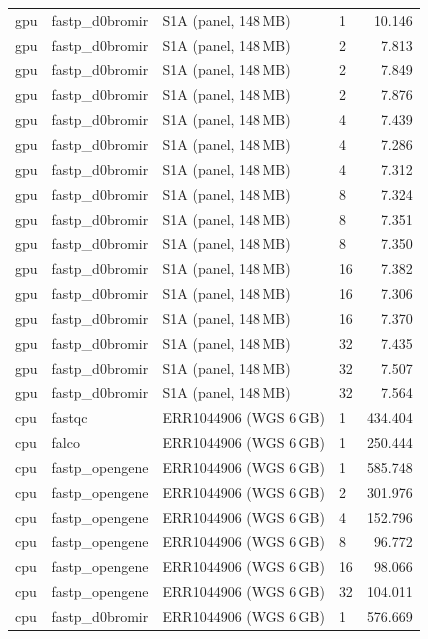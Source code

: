 \documentclass[a4paper,12pt]{article}
\begin{document}
\begin{longtable}{llllr}
  gpu & fastp\_d0bromir & S1A (panel, 148\,MB) & 1  & 10.146 \\
  gpu & fastp\_d0bromir & S1A (panel, 148\,MB) & 2  & 7.813 \\
  gpu & fastp\_d0bromir & S1A (panel, 148\,MB) & 2  & 7.849 \\
  gpu & fastp\_d0bromir & S1A (panel, 148\,MB) & 2  & 7.876 \\
  gpu & fastp\_d0bromir & S1A (panel, 148\,MB) & 4  & 7.439 \\
  gpu & fastp\_d0bromir & S1A (panel, 148\,MB) & 4  & 7.286 \\
  gpu & fastp\_d0bromir & S1A (panel, 148\,MB) & 4  & 7.312 \\
  gpu & fastp\_d0bromir & S1A (panel, 148\,MB) & 8  & 7.324 \\
  gpu & fastp\_d0bromir & S1A (panel, 148\,MB) & 8  & 7.351 \\
  gpu & fastp\_d0bromir & S1A (panel, 148\,MB) & 8  & 7.350 \\
  gpu & fastp\_d0bromir & S1A (panel, 148\,MB) & 16 & 7.382 \\
  gpu & fastp\_d0bromir & S1A (panel, 148\,MB) & 16 & 7.306 \\
  gpu & fastp\_d0bromir & S1A (panel, 148\,MB) & 16 & 7.370 \\
  gpu & fastp\_d0bromir & S1A (panel, 148\,MB) & 32 & 7.435 \\
  gpu & fastp\_d0bromir & S1A (panel, 148\,MB) & 32 & 7.507 \\
  gpu & fastp\_d0bromir & S1A (panel, 148\,MB) & 32 & 7.564 \\
  cpu & fastqc & ERR1044906 (WGS 6\,GB) & 1 & 434.404 \\
  cpu & falco  & ERR1044906 (WGS 6\,GB) & 1 & 250.444 \\
  cpu & fastp\_opengene & ERR1044906 (WGS 6\,GB) & 1  & 585.748 \\
  cpu & fastp\_opengene & ERR1044906 (WGS 6\,GB) & 2  & 301.976 \\
  cpu & fastp\_opengene & ERR1044906 (WGS 6\,GB) & 4  & 152.796 \\
  cpu & fastp\_opengene & ERR1044906 (WGS 6\,GB) & 8  &  96.772 \\
  cpu & fastp\_opengene & ERR1044906 (WGS 6\,GB) & 16 &  98.066 \\
  cpu & fastp\_opengene & ERR1044906 (WGS 6\,GB) & 32 & 104.011 \\
  cpu & fastp\_d0bromir & ERR1044906 (WGS 6\,GB) & 1  & 576.669 \\

\end{longtable}
\end{document}
